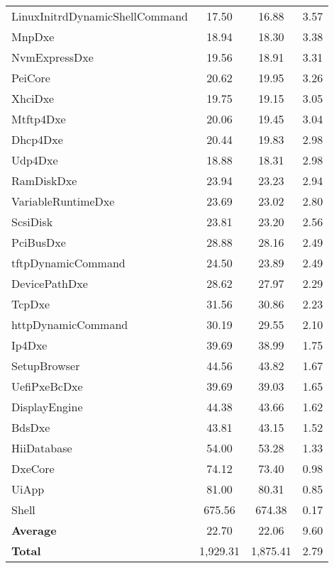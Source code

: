 \begin{longtable}{l c c c}
  LinuxInitrdDynamicShellCommand & 17.50 & 16.88 & 3.57\\
  MnpDxe & 18.94 & 18.30 & 3.38\\
  NvmExpressDxe & 19.56 & 18.91 & 3.31\\
  PeiCore & 20.62 & 19.95 & 3.26\\
  XhciDxe & 19.75 & 19.15 & 3.05\\
  Mtftp4Dxe & 20.06 & 19.45 & 3.04\\
  Dhcp4Dxe & 20.44 & 19.83 & 2.98\\
  Udp4Dxe & 18.88 & 18.31 & 2.98\\
  RamDiskDxe & 23.94 & 23.23 & 2.94\\
  VariableRuntimeDxe & 23.69 & 23.02 & 2.80\\
  ScsiDisk & 23.81 & 23.20 & 2.56\\
  PciBusDxe & 28.88 & 28.16 & 2.49\\
  tftpDynamicCommand & 24.50 & 23.89 & 2.49\\
  DevicePathDxe & 28.62 & 27.97 & 2.29\\
  TcpDxe & 31.56 & 30.86 & 2.23\\
  httpDynamicCommand & 30.19 & 29.55 & 2.10\\
  Ip4Dxe & 39.69 & 38.99 & 1.75\\
  SetupBrowser & 44.56 & 43.82 & 1.67\\
  UefiPxeBcDxe & 39.69 & 39.03 & 1.65\\
  DisplayEngine & 44.38 & 43.66 & 1.62\\
  BdsDxe & 43.81 & 43.15 & 1.52\\
  HiiDatabase & 54.00 & 53.28 & 1.33\\
  DxeCore & 74.12 & 73.40 & 0.98\\
  UiApp & 81.00 & 80.31 & 0.85\\
  Shell & 675.56 & 674.38 & 0.17\\
  \midrule
  \textbf{Average} & 22.70 & 22.06 & 9.60\\
  \textbf{Total} & 1,929.31 & 1,875.41 & 2.79\\
  \bottomrule
\end{longtable}

